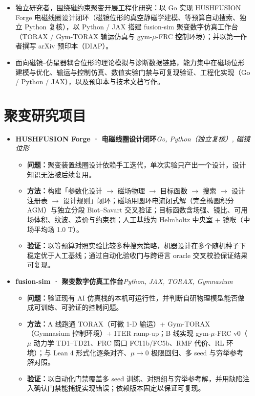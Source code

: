 \documentclass[10pt,a4paper]{article}
\newcommand{\resumeItem}[1]{\item \small #1}
\begin{document}
\begin{itemize}[leftmargin=0.15in, topsep=2pt]
\resumeItem{独立研究者，围绕磁约束聚变开展工程化研究：以 Go 实现 HUSHFUSION Forge 电磁线圈设计闭环（磁镜位形的真空静磁学建模、等预算自动搜索、独立 Python 复核），以 Python / JAX 搭建 fusion-sim 聚变数字仿真工作台（TORAX / Gym-TORAX 输运仿真与 gym-$\mu$-FRC 控制环境）；并以第一作者撰写 arXiv 预印本（DIAP）。}
\resumeItem{面向磁镜--仿星器耦合位形的理论模拟与诊断数据链路，能力集中在磁场位形建模与优化、输运与控制仿真、数值实验门禁与可复现验证、工程化实现（Go / Python / JAX），以及预印本与技术文档写作。}
\end{itemize}

\section{聚变研究项目}

\begin{itemize}[leftmargin=0.15in, label={}, topsep=2pt]

\item \textbf{HUSHFUSION Forge · 电磁线圈设计闭环}\hfill\textit{\small Go, Python（独立复核）, 磁镜位形}
\begin{itemize}[topsep=1pt, label=\textbullet]
\resumeItem{\textbf{问题：}聚变装置线圈设计依赖手工迭代，单次实验只产出一个设计，设计知识无法被后续复用。}
\resumeItem{\textbf{方法：}构建「参数化设计 $\to$ 磁场物理 $\to$ 目标函数 $\to$ 搜索 $\to$ 设计注册表 $\to$ 设计规则」闭环；磁场用圆环电流闭式解（完全椭圆积分 AGM）与独立分段 Biot--Savart 交叉验证；目标函数含场强、镜比、可用场体积、纹波、造价与约束罚；人工基线为 Helmholtz 中央室 + 镜喉（中场平均场 1.0 T）。}
\resumeItem{\textbf{验证：}以等预算对照实验比较多种搜索策略，机器设计在多个随机种子下稳定优于人工基线；通过自动化验收门与跨语言 oracle 交叉校验保证结果可复现。}
\end{itemize}

\item \textbf{fusion-sim · 聚变数字仿真工作台}\hfill\textit{\small Python, JAX, TORAX, Gymnasium}
\begin{itemize}[topsep=1pt, label=\textbullet]
\resumeItem{\textbf{问题：}验证现有 AI 仿真栈的本机可运行性，并判断自研物理模型能否做成可训练、可验证的控制问题。}
\resumeItem{\textbf{方法：}A 线跑通 TORAX（可微 1-D 输运）+ Gym-TORAX（Gymnasium 控制环境）+ ITER ramp-up；B 线实现 gym-$\mu$-FRC v0（$\mu$ 动力学 TD1--TD21、FRC 窗口 FC11b/FC5b、RMF 代价、RL 环境）；与 Lean 4 形式化逐条对齐、$\mu\to 0$ 极限回归、多 seed 与穷举参考解对照。}
\resumeItem{\textbf{验证：}以自动化门禁覆盖多 seed 训练、对照组与穷举参考解，并用缺陷注入确认门禁能捕捉实现错误；依赖版本固定以保证可复现。}
\end{itemize}

\end{itemize}
\end{document}
